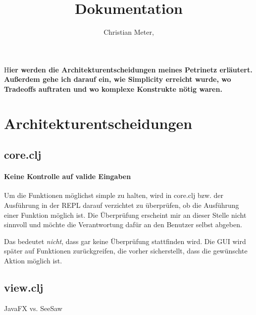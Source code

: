 \documentclass[DIV=calc, paper=a4, fontsize=12pt, twocolumn]{scrartcl}
\title{Dokumentation} %
\author{Christian Meter, } %
\date{} %
\newcommand{\initial}[1]{ %
\lettrine[lines=3,lhang=0.3,nindent=0em]{
\color{DarkGoldenrod}
{\textsf{#1}}}{}}
\begin{document}
\maketitle %

\thispagestyle{fancy} %


\initial{H}\textbf{ier werden die Architekturentscheidungen meines Petrinetz erläutert. Außerdem gehe ich darauf ein, wie Simplicity erreicht wurde, wo Tradeoffs auftraten und wo komplexe Konstrukte nötig waren.}


\section{Architekturentscheidungen}


\subsection{core.clj}

\paragraph{Keine Kontrolle auf valide Eingaben} Um die Funktionen möglichst simple zu halten, wird in core.clj bzw. der Ausführung in der REPL darauf verzichtet zu überprüfen, ob die Ausführung einer Funktion möglich ist. Die Überprüfung erscheint mir an dieser Stelle nicht sinnvoll und möchte die Verantwortung dafür an den Benutzer selbst abgeben.\par
Das bedeutet \emph{nicht}, dass gar keine Überprüfung stattfinden wird. Die GUI wird später auf Funktionen zurückgreifen, die vorher sicherstellt, dass die gewünschte Aktion möglich ist.


\subsection{view.clj}

JavaFX vs. SeeSaw




\end{document}
